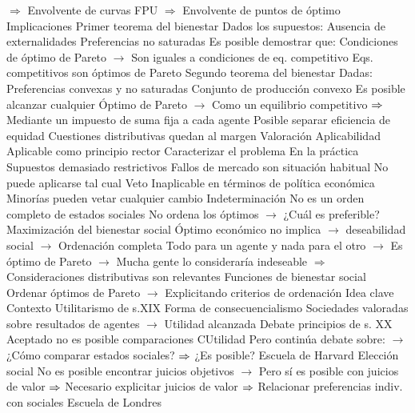\documentclass{nuevotema}
\begin{document}
\begin{esquemal}
				\4[] $\Rightarrow$ Envolvente de curvas FPU
				\4[] $\Rightarrow$ Envolvente de puntos de óptimo
				\4[] 
		\2 Implicaciones
			\3 Primer teorema del bienestar
				\4 Dados los supuestos:
				\4[] Ausencia de externalidades
				\4[] Preferencias no saturadas
				\4 Es posible demostrar que:
				\4[] Condiciones de óptimo de Pareto
				\4[] $\to$ Son iguales a condiciones de eq. competitivo
				\4[$\Rightarrow$] Eqs. competitivos son óptimos de Pareto
			\3 Segundo teorema del bienestar
				\4 Dadas:
				\4[] Preferencias convexas y no saturadas
				\4[] Conjunto de producción convexo
				\4 Es posible alcanzar cualquier Óptimo de Pareto
				\4[] $\to$ Como un equilibrio competitivo
				\4[] $\Rightarrow$ Mediante un impuesto de suma fija a cada agente
				\4[$\Rightarrow$] Posible separar eficiencia de equidad
				\4[$\Rightarrow$] Cuestiones distributivas quedan al margen
		\2 Valoración
			\3 Aplicabilidad
				\4 Aplicable como principio rector
				\4 Caracterizar el problema
				\4 En la práctica
				\4[] Supuestos demasiado restrictivos
				\4[] Fallos de mercado son situación habitual
				\4[] No puede aplicarse tal cual
			\3 Veto
				\4 Inaplicable en términos de política económica
				\4[] Minorías pueden vetar cualquier cambio
			\3 Indeterminación
				\4 No es un orden completo de estados sociales
				\4 No ordena los óptimos
				\4[] $\to$ ¿Cuál es preferible?
			\3 Maximización del bienestar social
				\4 Óptimo económico no implica
				\4[] $\to$ deseabilidad social
				\4[] $\to$ Ordenación completa
				\4[] Todo para un agente y nada para el otro
				\4[] $\to$ Es óptimo de Pareto
				\4[] $\to$ Mucha gente lo consideraría indeseable
				\4[] $\Rightarrow$ Consideraciones distributivas son relevantes
				\4 Funciones de bienestar social
				\4[] Ordenar óptimos de Pareto
				\4[] $\to$ Explicitando criterios de ordenación
	\1 
		\2 Idea clave
			\3 Contexto
				\4 Utilitarismo de s.XIX
				\4[] Forma de consecuencialismo
				\4[] Sociedades valoradas sobre resultados de agentes
				\4[] $\to$ Utilidad alcanzada
				\4 Debate principios de s. XX
				\4[] Aceptado no es posible comparaciones CUtilidad
				\4[] Pero continúa debate sobre:
				\4[] $\to$ ¿Cómo comparar estados sociales?
				\4[] $\Rightarrow$ ¿Es posible?
				\4 Escuela de Harvard
				\4[] Elección social
				\4[] No es posible encontrar juicios objetivos
				\4[] $\to$ Pero sí es posible con juicios de valor
				\4[] $\Rightarrow$ Necesario explicitar juicios de valor
				\4[] $\Rightarrow$ Relacionar preferencias indiv. con sociales
				\4 Escuela de Londres

\end{esquemal}
\end{document}

